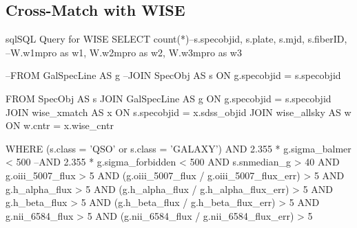 \documentclass[letterpaper, oneside]{article}
\begin{document}
\subsection{Cross-Match with WISE}

\begin{sourcecode}[\label{cross_id_wise}]{sql}{SQL Query for WISE}
SELECT count(*)--s.specobjid, s.plate, s.mjd, s.fiberID, 
--W.w1mpro as w1, W.w2mpro as w2, W.w3mpro as w3

--FROM GalSpecLine AS g 
--JOIN SpecObj AS s ON g.specobjid = s.specobjid

FROM SpecObj AS s
JOIN GalSpecLine AS g ON g.specobjid = s.specobjid
JOIN wise_xmatch AS x ON s.specobjid = x.sdss_objid
JOIN wise_allsky AS w ON w.cntr = x.wise_cntr

WHERE
(s.class = 'QSO' or s.class = 'GALAXY')
AND 2.355 * g.sigma_balmer < 500
--AND 2.355 * g.sigma_forbidden < 500
AND s.snmedian_g > 40
AND g.oiii_5007_flux > 5
AND (g.oiii_5007_flux / g.oiii_5007_flux_err) > 5
AND g.h_alpha_flux > 5
AND (g.h_alpha_flux / g.h_alpha_flux_err) > 5
AND g.h_beta_flux > 5
AND (g.h_beta_flux / g.h_beta_flux_err) > 5
AND g.nii_6584_flux > 5
AND (g.nii_6584_flux / g.nii_6584_flux_err) > 5
\end{sourcecode}




\end{document}
